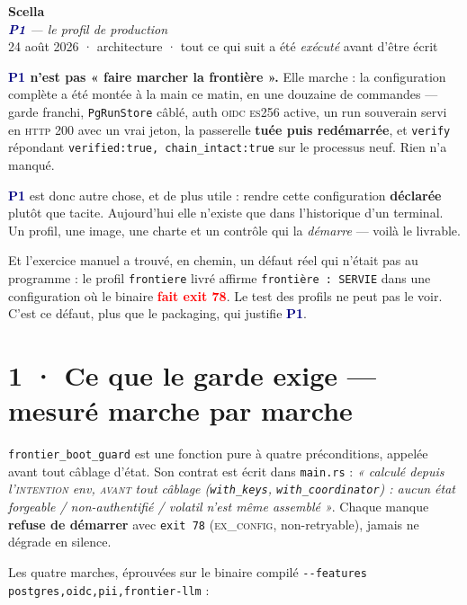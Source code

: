 \documentclass[10pt]{article}
\newcommand{\pire}[1]{\textcolor{red}{\textbf{#1}}}
\newcommand{\code}[1]{\texttt{\small #1}}
\newcommand{\mm}[1]{\textbf{\textcolor{navy}{#1}}}
\begin{document}
\begin{center}
{\Huge\bfseries\color{navy} Scella}\\[4pt]
{\large\color{grey}\itshape \mm{P1} --- le profil de production}\\[4pt]
{\small\color{grey} 24 août 2026 \; · \; architecture \; · \; tout ce qui suit a été
\emph{exécuté} avant d'être écrit}
\end{center}
\vspace{2pt}

\begin{these}
\textbf{\mm{P1} n'est pas « faire marcher la frontière ».} Elle marche : la configuration complète a
été montée à la main ce matin, en une douzaine de commandes --- garde franchi, \code{PgRunStore}
câblé, auth \textsc{oidc} \textsc{es}256 active, un run souverain servi en \textsc{http} 200 avec un
vrai jeton, la passerelle \textbf{tuée puis redémarrée}, et \code{verify} répondant
\code{verified:true, chain\_intact:true} sur le processus neuf. Rien n'a manqué.

\mm{P1} est donc autre chose, et de plus utile : rendre cette configuration \textbf{déclarée}
plutôt que tacite. Aujourd'hui elle n'existe que dans l'historique d'un terminal. Un profil, une
image, une charte et un contrôle qui la \emph{démarre} --- voilà le livrable.

Et l'exercice manuel a trouvé, en chemin, un défaut réel qui n'était pas au programme : le profil
\code{frontiere} livré affirme \code{frontière : SERVIE} dans une configuration où le binaire
\pire{fait exit 78}. Le test des profils ne peut pas le voir. C'est ce défaut, plus que le
packaging, qui justifie \mm{P1}.
\end{these}

\section{1 · Ce que le garde exige --- mesuré marche par marche}

\code{frontier\_boot\_guard} est une fonction pure à quatre préconditions, appelée avant tout
câblage d'état. Son contrat est écrit dans \code{main.rs} : \emph{« calculé depuis l'\textsc{intention}
env, \textsc{avant} tout câblage (\code{with\_keys}, \code{with\_coordinator}) : aucun état
forgeable / non-authentifié / volatil n'est même assemblé »}. Chaque manque \textbf{refuse de
démarrer} avec \code{exit 78} (\textsc{ex\_config}, non-retryable), jamais ne dégrade en silence.

Les quatre marches, éprouvées sur le binaire compilé \code{-{}-features postgres,oidc,pii,frontier-llm} :
\end{document}
